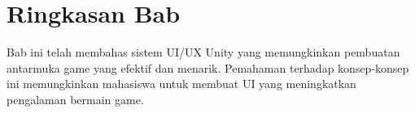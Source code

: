 \section{Ringkasan Bab}

Bab ini telah membahas sistem UI/UX Unity yang memungkinkan pembuatan antarmuka game yang efektif dan menarik. Pemahaman terhadap konsep-konsep ini memungkinkan mahasiswa untuk membuat UI yang meningkatkan pengalaman bermain game.

